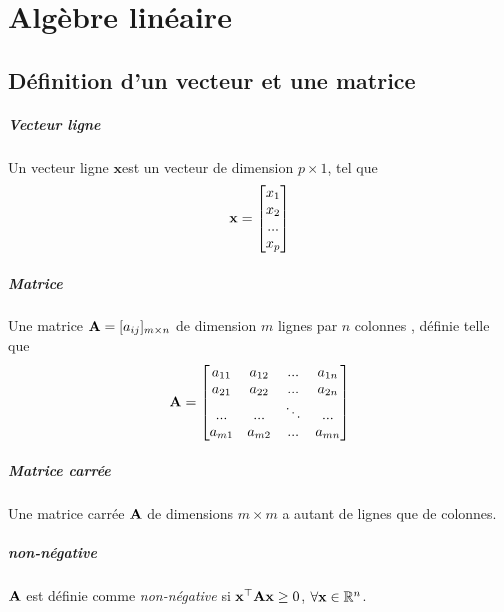 \chapter{Algèbre linéaire}

\section{Définition d'un vecteur et une matrice}
\paragraph{Vecteur ligne} Un vecteur ligne $\bm{x}$est un vecteur de dimension $p \times 1$, tel que
\begin{align*}
\mathbf{x} = 
\begin{bmatrix}
x_1 \\
x_2 \\
... \\
x_p \\
\end{bmatrix}
\end{align*}

\paragraph{Matrice} Une matrice $\mathbf{A}=[a_{ij}]_{m \times n}$  de dimension $m$ lignes par $n$ colonnes , définie telle que
\begin{equation}
\label{eq:matrice-base}
\mathbf{A} = 
\begin{bmatrix}
a_{11}    & a_{12}    &  ...   &  a_{1n} \\
a_{21}    & a_{22}    &  ...   &  a_{2n} \\
...    & ...    &  \ddots   &  ... \\
a_{m1}    & a_{m2}    &  ...   &  a_{mn} \\
\end{bmatrix}
\end{equation}


\paragraph{Matrice carrée} Une matrice carrée $\mathbf{A}$ de dimensions $m \times m$ a autant de lignes que de colonnes.

\paragraph{non-négative} $\mathbf{A}$ est définie comme \textit{non-négative} si $\mathbf{x^{\top} A x }\geq 0$, $\forall \mathbf{x}\in \mathbb{R}^n$.

